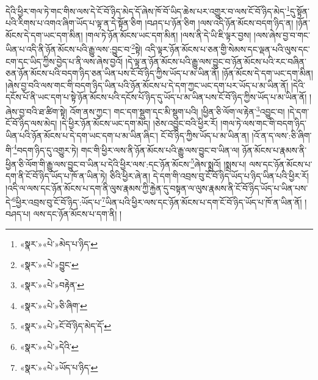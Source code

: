 དེའི་ཕྱིར་གལ་ཏེ་གང་གིས་ལས་དེ་ངོ་བོ་ཉིད་མེད་དོ་ཞེས་ཁོ་བོ་ཡིད་ཆེས་པར་འགྱུར་བ་ལས་ངོ་བོ་ཉིད་མེད་\footnote{«སྣར་»«པེ་»མེད་པ་ཉིད་}དུ་སྟོན་པའི་རིགས་པ་འགའ་ཞིག་ཡོད་པ་ལྟ་ན་དེ་སྟོན་ཅིག །བཤད་པ་ཉོན་ཅིག །ལས་འདི་ཉོན་མོངས་བདག་ཉིད་ན། །ཉོན་མོངས་དེ་དག་ཡང་དག་མིན། །གལ་ཏེ་ཉོན་མོངས་ཡང་དག་མིན། །ལས་ནི་དེ་ཡི་ཇི་ལྟར་བྱས། །ལས་ཞེས་བྱ་བ་གང་ཡིན་པ་འདི་ནི་ཉོན་མོངས་པའི་རྒྱུ་ལས་:བྱུང་བ་\footnote{«སྣར་»«པེ་»བྱུང་}སྟེ། འདི་ལྟར་ཉོན་མོངས་པ་ཅན་གྱི་སེམས་དང་ལྡན་པའི་ལུས་དང་ངག་དང་ཡིད་ཀྱིས་བྱེད་པ་ནི་ལས་ཞེས་བྱའོ། །དེ་ལྟ་ན་ཉོན་མོངས་པའི་རྒྱུ་ལས་བྱུང་བ་ཉོན་མོངས་པའི་རང་བཞིན་ཅན་ཉོན་མོངས་པའི་བདག་ཉིད་ཅན་ཡིན་པས་ངོ་བོ་ཉིད་ཀྱིས་ཡོད་པ་མ་ཡིན་ནོ། །ཉོན་མོངས་དེ་དག་ཡང་དག་མིན། །ཞེས་བྱ་བའི་ལས་གང་གི་བདག་ཉིད་ཡིན་པའི་ཉོན་མོངས་པ་དེ་དག་ཀྱང་ཡང་དག་པར་ཡོད་པ་མ་ཡིན་ནོ། །དེའི་དངོས་པོ་ནི་ཡང་དག་པ་སྟེ་ཉོན་མོངས་པའི་དངོས་པོ་ཉིད་དུ་ཡོད་པ་མ་ཡིན་པས་ངོ་བོ་ཉིད་ཀྱིས་ཡོད་པ་མ་ཡིན་ནོ། །ཞེས་བྱ་བའི་ཐ་ཚིག་སྟེ། འོག་ནས་ཀྱང་། གང་དག་སྡུག་དང་མི་སྡུག་པའི། །ཕྱིན་ཅི་ལོག་ལ་རྟེན་\footnote{«སྣར་»«པེ་»བརྟེན་}འབྱུང་བ། །དེ་དག་ངོ་བོ་ཉིད་ལས་མེད། །དེ་ཕྱིར་ཉོན་མོངས་ཡང་དག་མེད། །ཅེས་འབྱུང་བའི་ཕྱིར་རོ། །གལ་ཏེ་ལས་གང་གི་བདག་ཉིད་ཡིན་པའི་ཉོན་མོངས་པ་དེ་དག་ཡང་དག་པ་མ་ཡིན་ཞིང་། ངོ་བོ་ཉིད་ཀྱིས་ཡོད་པ་མ་ཡིན་ན། །འོ་ན་ད་ལས་:ཅི་ཞིག་གི་\footnote{«སྣར་»«པེ་»ཅི་ཞིག་}བདག་ཉིད་དུ་འགྱུར་ཏེ། གང་གི་ཕྱིར་ལས་ནི་ཉོན་མོངས་པའི་རྒྱུ་ལས་བྱུང་བ་ཡིན་ལ། ཉོན་མོངས་པ་རྣམས་ནི་ཕྱིན་ཅི་ལོག་གི་རྒྱུ་ལས་བྱུང་བ་ཡིན་པ་དེའི་ཕྱིར་ལས་:དང་ཉོན་མོངས་\footnote{«སྣར་»«པེ་»ངོ་བོ་ཉིད་མེད་དོ་}ཞེས་སྨྲའོ། །སྨྲས་པ། ལས་དང་ཉོན་མོངས་པ་དག་ནི་ངོ་བོ་ཉིད་ཡོད་པ་ཁོ་ན་ཡིན་ཏེ། ཅིའི་ཕྱིར་ཞེ་ན། དེ་དག་གི་འབྲས་བུ་ངོ་བོ་ཉིད་ཡོད་པ་ཉིད་ཡིན་པའི་ཕྱིར་རོ། །འདི་ལ་ལས་དང་ཉོན་མོངས་པ་དག་ནི་ལུས་རྣམས་ཀྱི་རྐྱེན་དུ་བསྟན་ལ་ལུས་རྣམས་ནི་ངོ་བོ་ཉིད་ཡོད་པ་ཡིན་པས་དེ་\footnote{«སྣར་»«པེ་»དེའི་}ཕྱིར་འབྲས་བུ་ངོ་བོ་ཉིད་:ཡོད་པ་\footnote{«སྣར་»«པེ་»ཡོད་པ་ཉིད་}ཡིན་པའི་ཕྱིར་ལས་དང་ཉོན་མོངས་པ་དག་ངོ་བོ་ཉིད་ཡོད་པ་ཁོ་ན་ཡིན་ནོ། །བཤད་པ། ལས་དང་ཉོན་མོངས་པ་དག་ནི། །
